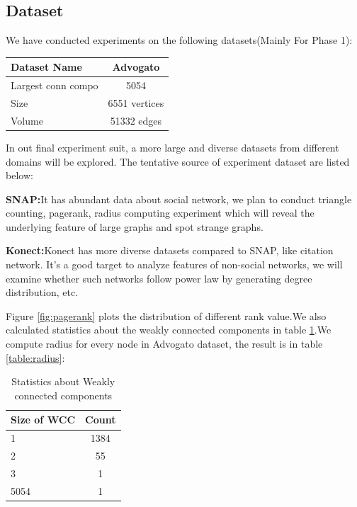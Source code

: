 \subsection{Dataset}
We have conducted experiments on the following datasets(Mainly For Phase 1):
\begin{center}
\begin{tabular}{| l | c |}
  \hline                        
  Dataset Name & Advogato  \\ \hline
  Largest conn compo & 5054  \\ \hline
  Size & 6551 vertices  \\ \hline
  Volume & 51332 edges \\ \hline
\end{tabular}
\end{center}

In out final experiment suit, a more large and diverse datasets from different domains will be explored. The tentative source of experiment dataset are listed below:
\begin{description}
	\item{{\bf SNAP:}}{It has abundant data about social network, we plan to conduct triangle counting, pagerank, radius computing experiment which will reveal the underlying feature of large graphs and spot strange graphs.}
	\item{{\bf Konect:}}{Konect has more diverse datasets compared to SNAP, like citation network. It's a good target to analyze features of non-social networks, we will examine whether such networks follow power law by generating degree distribution, etc.}
\end{description}

Figure \ref{fig:pagerank} plots the distribution of different rank value.We also calculated statistics about the weakly connected components in table \ref{table:wcc}.We compute radius for every node in Advogato dataset, the result is in table \ref{table:radius}:















\begin{table}
\begin{center}
\begin{tabular}{| l | c |}
  \hline                        
  Size of WCC & Count  \\ \hline
  1 & 1384  \\ \hline
  2 & 55  \\ \hline
  3 & 1 \\ \hline
  5054 & 1 \\ \hline  
\end{tabular}
\caption{Statistics about Weakly connected components}
\label{table:wcc}
\end{center}
\end{table}

